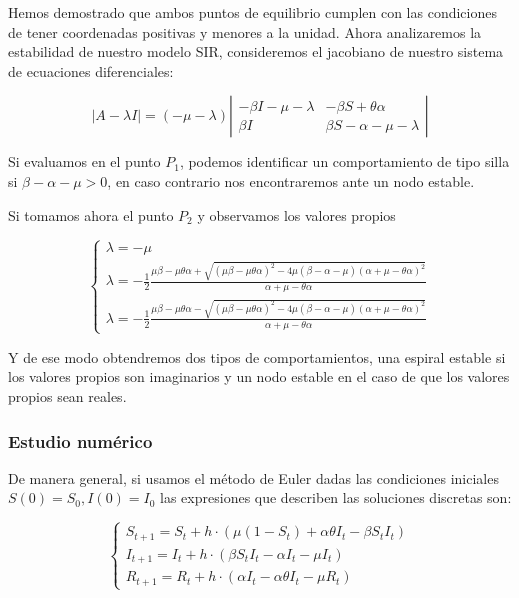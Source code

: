 Hemos demostrado que ambos puntos de equilibrio cumplen con las condiciones de tener coordenadas positivas y menores a la unidad. Ahora analizaremos la estabilidad de nuestro modelo SIR, consideremos el jacobiano de nuestro sistema de ecuaciones diferenciales:

$$|A-\lambda I|=(-\mu-\lambda)
\left|\begin{array}{cc}
-\beta I-\mu-\lambda & -\beta S+\theta\alpha\\
\beta I & \beta S-\alpha-\mu -\lambda
\end{array}\right|$$

Si evaluamos en el punto $P_1$, podemos identificar un comportamiento de tipo silla si $\beta-\alpha-\mu>0$, en caso contrario nos encontraremos ante un nodo estable.

Si tomamos ahora el punto $P_2$ y observamos los valores propios 

$$\left\{\begin{array}{l}
\lambda=-\mu\\
\lambda=-\frac{1}{2}\frac{\mu\beta-\mu\theta\alpha+\sqrt{(\mu\beta-\mu\theta\alpha)^2-4\mu(\beta-\alpha-\mu)(\alpha+\mu-\theta\alpha)^2}}{\alpha+\mu-\theta\alpha} \\
\lambda=-\frac{1}{2}\frac{\mu\beta-\mu\theta\alpha-\sqrt{(\mu\beta-\mu\theta\alpha)^2-4\mu(\beta-\alpha-\mu)(\alpha+\mu-\theta\alpha)^2}}{\alpha+\mu-\theta\alpha}
\end{array}\right.$$

Y de ese modo obtendremos dos tipos de comportamientos, una espiral estable si los valores propios son imaginarios y un nodo estable en el caso de que los valores propios sean reales.

\subsubsection{Estudio numérico}

De manera general, si usamos el método de Euler dadas las condiciones iniciales $S(0)=S_0,I(0)=I_0$ las expresiones que describen las soluciones discretas son:

$$\left\{\begin{array}{l}
S_{t+1} = S_t + h\cdot(\mu(1 - S_t) + \alpha\theta I_t - \beta S_t I_t) \\
I_{t+1} = I_t + h\cdot(\beta S_t I_t - \alpha I_t - \mu I_t) \\
R_{t+1} = R_t + h\cdot(\alpha I_t - \alpha\theta I_t - \mu R_t)
\end{array}\right.$$

